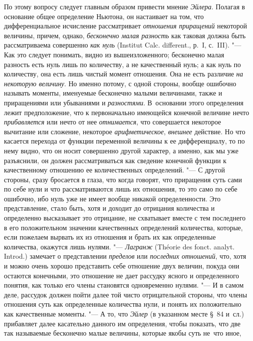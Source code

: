 По этому вопросу следует главным образом привести мнение {\em Эйлера}. Полагая
в основание общее определение Ньютона, он настаивает на том, что
дифференциальное исчисление рассматривает {\em отношения приращений} некоторой
величины, причем, однако, {\em бесконечно малая разность} как таковая должна
быть рассматриваема совершенно {\em как нуль} (Ins\-ti\-tut Calc.
dif\-fe\-rent., р.~I, с.~III). "--- Как это следует понимать, видно из
вышеизложенного; бесконечно малая разность есть нуль лишь по количеству, а не
качественный нуль; а как нуль по количеству, она есть лишь чистый момент
отношения. Она не есть различие {\em на некоторую величину}. Но именно потому,
с одной стороны, вообще ошибочно называть моменты, именуемые бесконечно малыми
величинами, также и приращениями или убываниями и {\em разностями}. В~основании
этого определения лежит предположение, что к первоначально имеющейся конечной
величине нечто {\em прибавляется} или нечто от нее {\em отнимается}, что
совершается некоторое вычитание или сложение, некоторое {\em арифметическое},
{\em внешнее} действие. Но что касается перехода от функции переменной величины
к ее дифференциалу, то по нему видно, что он носит совершенно другой характер,
а именно, как мы уже разъяснили, он должен рассматриваться как сведение
конечной функции к качественному отношению ее количественных определений. "---
С другой стороны, сразу бросается в глаза, что когда говорят, что приращения
суть сами по себе нули и что рассматриваются лишь их отношения, то это само по
себе ошибочно, ибо нуль уже не имеет вообще никакой определенности. Это
представление, стало быть, хотя и доходит до отрицания количества и определенно
высказывает это отрицание, не схватывает вместе с тем последнего в его
положительном значении качественных определений количества, которые, если
пожелаем вырвать их из отношения и брать их как определенные количества,
окажутся лишь нулями. "--- {\em Лагранж} (Théorie des fonct. analyt. Introd.)
замечает о представлении {\em пределов} или {\em последних отношений}, что,
хотя и можно очень хорошо представить себе отношение двух величин, покуда они
остаются конечными, это отношение не дает рассудку ясного и определенного
понятия, как только его члены становятся одновременно нулями. "--- И в самом
деле, рассудок должен пойти далее той чисто отрицательной стороны, что члены
отношения суть как определенные количества нули, и понять их положительно как
качественные моменты. "--- А то, что {\em Эйлер} (в указанном месте \S~84
и~сл.) прибавляет далее касательно данного им определения, чтобы показать, что
две так называемые бесконечно малые величины, которые якобы суть не~что иное,
